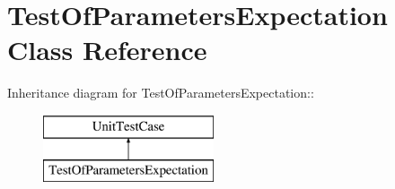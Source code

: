 \hypertarget{class_test_of_parameters_expectation}{
\section{TestOfParametersExpectation Class Reference}
\label{class_test_of_parameters_expectation}
}
Inheritance diagram for TestOfParametersExpectation::\begin{figure}[H]
\begin{center}
\leavevmode
\includegraphics[height=2cm]{class_test_of_parameters_expectation}
\end{center}
\end{figure}
